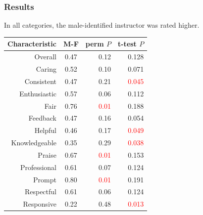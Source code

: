 \documentclass{beamer}
\begin{document}
\frame
{
  \frametitle{Results}
In all categories, the male-identified instructor was rated higher.
\begin{table}
\begin{tabular}{r|crr}
\textbf{Characteristic} & \textbf{M-F} & \textbf{perm} $P$ & \textbf{t-test} $P$ \\
\hline
Overall & 0.47 & 0.12 & 0.128\\
Caring & 0.52 & 0.10 & 0.071\\
Consistent & 0.47 & 0.21 & \textcolor{red}{0.045} \\ 
Enthusiastic & 0.57 & 0.06 & 0.112 \\
Fair & 0.76 & \textcolor{red}{0.01} & 0.188 \\
Feedback & 0.47 & 0.16 & 0.054 \\
Helpful & 0.46 & 0.17 & \textcolor{red}{0.049} \\
Knowledgeable & 0.35 & 0.29 & \textcolor{red}{0.038} \\
Praise & 0.67 & \textcolor{red}{0.01} & 0.153 \\
Professional & 0.61 & 0.07 & 0.124 \\
Prompt & 0.80 & \textcolor{red}{0.01} & 0.191 \\
Respectful & 0.61 & 0.06 & 0.124 \\
Responsive & 0.22 & 0.48 & \textcolor{red}{0.013}
\end{tabular}
\end{table}

}



\end{document}

